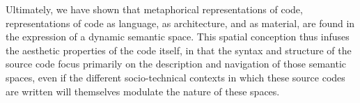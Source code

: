 \documentclass{article}
\begin{document}
Ultimately, we have shown that metaphorical representations of code, representations of code as language, as architecture, and as material, are found in the expression of a dynamic semantic space. This spatial conception thus infuses the aesthetic properties of the code itself, in that the syntax and structure of the source code focus primarily on the description and navigation of those semantic spaces, even if the different socio-technical contexts in which these source codes are written will themselves modulate the nature of these spaces.

\pagebreak



\end{document}
